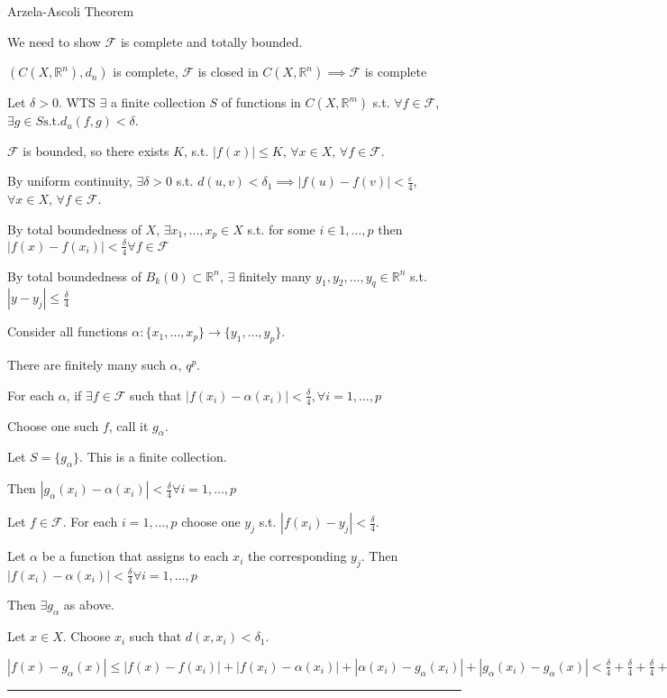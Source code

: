 \documentclass[twoside]{article}
\newcommand{\FF}{\mathcal{F}}
\renewcommand{\d}{\delta}
\renewcommand{\a}{\alpha}
\newcommand{\ep}{\varepsilon}
\newenvironment{proof}{{\bf Proof:}}{\hfill\rule{2mm}{2mm}}
\newcommand\R{\mathbb{R}}
\begin{document}
\begin{proof} {Arzela-Ascoli Theorem}
    
    We need to show $\mathcal F$ is complete and totally bounded.

    $(C(X, \R^n), d_n)$ is complete, $\FF$ is closed in $C(X,\R^n) \implies \FF $ is complete

    Let $\d > 0$. WTS $\exists$ a finite collection $S$ of functions in $C(X, \R^m)$ s.t. $\forall f \in \FF$, $\exists g \in S \text{s.t.} d_u(f,g) < \d$.

    $\FF $ is bounded, so there exists $K$, s.t.  $|f(x)| \leq K$, $\forall x \in X$, $\forall f \in \FF$.

    By uniform continuity, $\exists \d > 0$ s.t. $d(u,v) < \d_1 \implies |f(u) - f(v)| < \frac\ep4$, $\forall x \in X$, $\forall f \in \FF$.

    By total boundedness of $X$, $\exists x_1, \dots, x_p \in X$ s.t. for some $i \in 1,\dots,p$ then $|f(x) - f(x_i)| < \frac\d4 \forall f \in \FF$

    By total boundedness of $B_k(0) \subset \R^n$, $\exists$ finitely many $y_1, y_2, \dots, y_q \in \R^n$ s.t. $|y - y_j| \leq \frac\d4$

    Consider all functions $\alpha: \{x_1, \dots, x_p\} \rightarrow \{y_1, \dots, y_p\}$.

    There are finitely many such $\alpha$, $q^p$.

    For each $\alpha$, if $\exists f \in \FF$ such that $|f(x_i) - \a(x_i)| < \frac\d4, \forall i = 1, \dots, p$

    Choose one such $f$, call it $g_\alpha$. 

    Let $S = \{g_\alpha\}$. This is a finite collection. 

    Then $|g_\alpha(x_i) - \a(x_i)| < \frac\d4 \forall i = 1, \dots, p $

    Let $f \in \FF$. For each $i = 1, \dots, p$ choose one $y_j$ s.t. $|f(x_i) - y_j| < \frac\d4$.

    Let $\a$ be a function that assigns to each $x_i$ the corresponding $y_j$. Then $|f(x_i) - \a(x_i)| < \frac\d4 \forall i = 1, \dots, p$

    Then $\exists g_\a$ as above. 

    Let $x \in X$. Choose $x_i$ such that $d(x, x_i) < \d_1$. 

    $|f(x) - g_\a(x)| \leq |f(x) - f(x_i)| + |f(x_i) - \a(x_i)| + |\a(x_i) - g_\a(x_i)| + |g_\a(x_i) - g_\a(x)| <  \frac\d4 + \frac\d4 + \frac\d4 + \frac\d4 = \d$

\end{proof}
\end{document}
